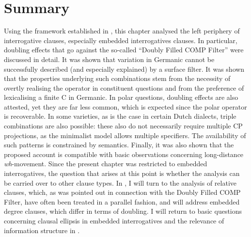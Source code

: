 \section{Summary} \label{section:3summary}
Using the framework established in , this chapter analysed the left periphery of interrogative clauses, especially embedded interrogatives clauses. In particular, doubling effects that go against the so-called ``Doubly Filled COMP Filter'' were discussed in detail. It was shown that variation in Germanic cannot be successfully described (and especially explained) by a surface filter. It was shown that the properties underlying such combinations stem from  the necessity of overtly realising the operator in constituent questions and from the preference of lexicalising a finite C in Germanic. In polar questions, doubling effects are also attested, yet they are far less common, which is expected since the polar operator is recoverable. In some varieties, as is the case in certain Dutch dialects, triple combinations are also possible: these also do not necessarily require multiple CP projections, as the minimalist model allows multiple specifiers. The availability of such patterns is constrained by semantics. Finally, it was also shown that the proposed account is compatible with basic observations concerning long-distance \textit{wh}-movement. Since the present chapter was restricted to embedded interrogatives, the question that arises at this point is whether the analysis can be carried over to other clause types. In , I will turn to the analysis of relative clauses, which, as was pointed out in connection with the Doubly Filled COMP Filter, have often been treated in a parallel fashion, and  will address embedded degree clauses, which differ in terms of doubling. I will return to basic questions concerning clausal ellipsis in embedded interrogatives and the relevance of information structure in .
